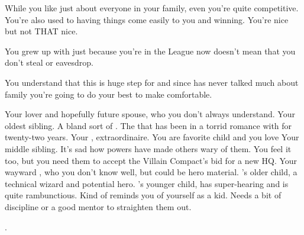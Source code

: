 \documentclass[char]{LRSguildcamp1}
\begin{document}
\begin{itemz}[Notes]
	\item While you like just about everyone in your family, even \cOldest{} you're quite competitive. You're also used to having things come easily to you and winning. You're nice but not THAT nice. 
	\item You grew up with \cGrandma{} just because you're in the League now doesn't mean that you don't steal or eavesdrop. 
	\item You understand that this is huge step for \cYS{} and since \cYS{} has never talked much about family you're going to do your best to make \cYS{} comfortable. 

\end{itemz}

\begin{contacts}
	\contact{\YS{}}  Your lover and hopefully future spouse, who you don't always understand. 	\contact{\cOldest{}} Your oldest sibling. A bland sort of \cOldest{\villain}. 
	\contact{\cOS{}} The \cOS{\hero} that has been in a torrid romance with \cOldest{} for twenty-two years.
	\contact{\cGrandma{}} Your \cGrandma{\parent}, \cGrandma{\villain} extraordinaire.  You are \cGrandma{\their} favorite child and you love \cGrandma{\them}
	\contact{\cArchitect{}} Your middle sibling. It's sad how \cArchitect{\their} powers have made others wary of them. You feel it too, but you need them to accept the Villain Compact's bid for a new HQ.
	\contact{\cGrad{}} Your wayward \cGrad{}, who you don't know well, but could be hero material.
	\contact{\cTeen{}} \cArchitect{}'s older child, a technical wizard and potential hero. 
	\contact{\cTween{}} \cArchitect{}'s younger child, has super-hearing and is quite rambunctious. Kind of reminds you of yourself as a kid. Needs a bit of discipline or a good mentor to straighten them out. 
	
	. 
	
\end{contacts}
\end{document}
